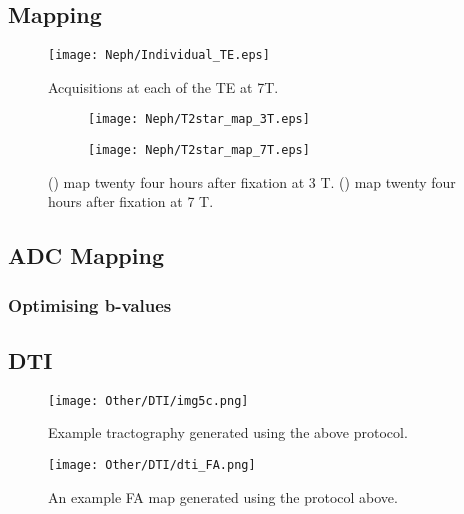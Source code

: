 \subsection{\ttwostar Mapping}
\begin{figure}[H]
	\centering
	\texttt{[image: Neph/Individual\_TE.eps]}
	\caption{Acquisitions at each of the \ac{TE} at 7T.}
	\label{fig:ex_t2star_raw_data}	
\end{figure}

\begin{figure}[H]
	\centering
	\begin{subfigure}[c]{0.47\textwidth}
		\centering
		\texttt{[image: Neph/T2star\_map\_3T.eps]}
		\caption{}
		\label{fig:ex_t2star_map_3t}
	\end{subfigure}
	\hfill
	\begin{subfigure}[c]{0.47\textwidth}
		\centering
		\texttt{[image: Neph/T2star\_map\_7T.eps]}
		\caption{}
		\label{fig:ex_t2star_map_7t}
	\end{subfigure}
	\caption{() \ttwostar map twenty four hours after fixation at 3 T. () \ttwostar map twenty four hours after fixation at 7 T.}
	\label{fig:ex_t2star_maps}
\end{figure}

\subsection{\acl*{ADC} Mapping}

\subsubsection{Optimising b-values}


\subsection{\acl*{DTI}}
\begin{figure}[H]
	\centering
	\texttt{[image: Other/DTI/img5c.png]}
	\caption{Example tractography generated using the above protocol.}
	\label{fig:ex_dti_tracts}
\end{figure}

\begin{figure}[H]
	\centering
	\texttt{[image: Other/DTI/dti\_FA.png]}
	\caption{An example \ac{FA} map generated using the protocol above.}
	\label{fig:ex_dti_fa}
\end{figure}

